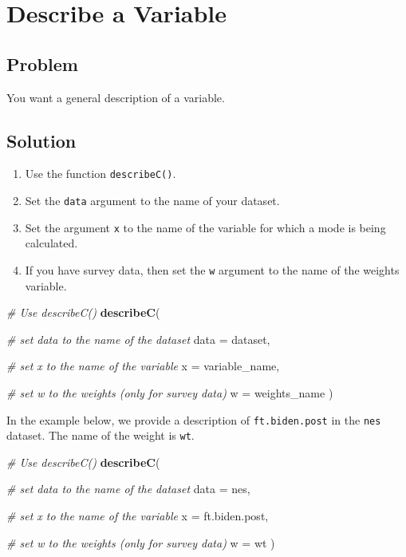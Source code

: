 \documentclass[
]{book}
\newenvironment{Shaded}{\begin{snugshade}}{\end{snugshade}}
\newcommand{\AttributeTok}[1]{\textcolor[rgb]{0.13,0.29,0.53}{#1}}
\newcommand{\CommentTok}[1]{\textcolor[rgb]{0.56,0.35,0.01}{\textit{#1}}}
\newcommand{\FunctionTok}[1]{\textcolor[rgb]{0.13,0.29,0.53}{\textbf{#1}}}
\newcommand{\NormalTok}[1]{#1}
\providecommand{\tightlist}{%
  \setlength{\itemsep}{0pt}\setlength{\parskip}{0pt}}
\begin{document}
\hypertarget{describe}{%
\section{Describe a Variable}\label{describe}}

\hypertarget{problem-34}{%
\subsection{Problem}\label{problem-34}}

You want a general description of a variable.

\hypertarget{solution-33}{%
\subsection{Solution}\label{solution-33}}

\begin{enumerate}
\def\labelenumi{\arabic{enumi}.}
\tightlist
\item
  Use the function \texttt{describeC()}.
\item
  Set the \texttt{data} argument to the name of your dataset.
\item
  Set the argument \texttt{x} to the name of the variable for which a mode is being calculated.
\item
  If you have survey data, then set the \texttt{w} argument to the name of the weights variable.
\end{enumerate}

\begin{Shaded}
\begin{Highlighting}[]
\CommentTok{\# Use \textasciigrave{}describeC()\textasciigrave{}}
\FunctionTok{describeC}\NormalTok{(}
  
  \CommentTok{\# set data to the name of the dataset}
  \AttributeTok{data =}\NormalTok{ dataset,}
  
  \CommentTok{\# set x to the name of the variable}
  \AttributeTok{x =}\NormalTok{ variable\_name,}
  
  \CommentTok{\# set w to the weights (only for survey data)}
  \AttributeTok{w =}\NormalTok{ weights\_name}
\NormalTok{)}
\end{Highlighting}
\end{Shaded}

In the example below, we provide a description of \texttt{ft.biden.post} in the \texttt{nes} dataset. The name of the weight is \texttt{wt}.

\begin{Shaded}
\begin{Highlighting}[]
\CommentTok{\# Use \textasciigrave{}describeC()\textasciigrave{}}
\FunctionTok{describeC}\NormalTok{(}
  
  \CommentTok{\# set data to the name of the dataset}
  \AttributeTok{data =}\NormalTok{ nes,}
  
  \CommentTok{\# set x to the name of the variable}
  \AttributeTok{x =}\NormalTok{ ft.biden.post,}
  
  \CommentTok{\# set w to the weights (only for survey data)}
  \AttributeTok{w =}\NormalTok{ wt}
\NormalTok{)}
\end{Highlighting}
\end{Shaded}
\end{document}
